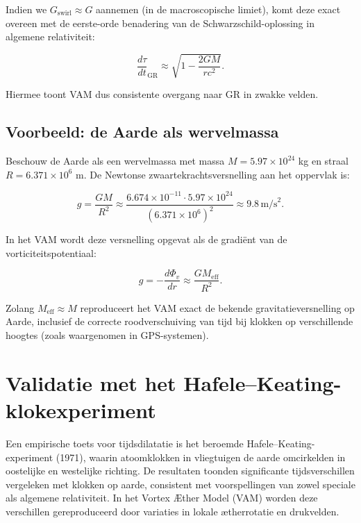 Indien we $G_{\text{swirl}} \approx G$ aannemen (in de macroscopische limiet), komt deze exact overeen met de eerste-orde benadering van de Schwarzschild-oplossing in algemene relativiteit:

\begin{equation}
\frac{d\tau}{dt}_\text{GR} \approx \sqrt{1 - \frac{2GM}{rc^2}}.
\end{equation}

Hiermee toont VAM dus consistente overgang naar GR in zwakke velden.

\subsection{Voorbeeld: de Aarde als wervelmassa}

Beschouw de Aarde als een wervelmassa met massa $M = 5.97 \times 10^{24}$ kg en straal $R = 6.371 \times 10^6$ m. De Newtonse zwaartekrachtsversnelling aan het oppervlak is:

\begin{equation}
g = \frac{G M}{R^2} \approx \frac{6.674 \times 10^{-11} \cdot 5.97 \times 10^{24}}{(6.371 \times 10^6)^2} \approx 9.8 \, \text{m/s}^2.
\end{equation}

In het VAM wordt deze versnelling opgevat als de gradiënt van de vorticiteitspotentiaal:

\begin{equation}
g = -\frac{d\Phi_v}{dr} \approx \frac{G M_{\text{eff}}}{R^2}.
\end{equation}

Zolang $M_{\text{eff}} \approx M$ reproduceert het VAM exact de bekende gravitatieversnelling op Aarde, inclusief de correcte roodverschuiving van tijd bij klokken op verschillende hoogtes (zoals waargenomen in GPS-systemen).

\section{Validatie met het Hafele–Keating-klokexperiment}

Een empirische toets voor tijdsdilatatie is het beroemde Hafele–Keating-experiment (1971), waarin atoomklokken in vliegtuigen de aarde omcirkelden in oostelijke en westelijke richting. De resultaten toonden significante tijdsverschillen vergeleken met klokken op aarde, consistent met voorspellingen van zowel speciale als algemene relativiteit. In het Vortex Æther Model (VAM) worden deze verschillen gereproduceerd door variaties in lokale ætherrotatie en drukvelden.

